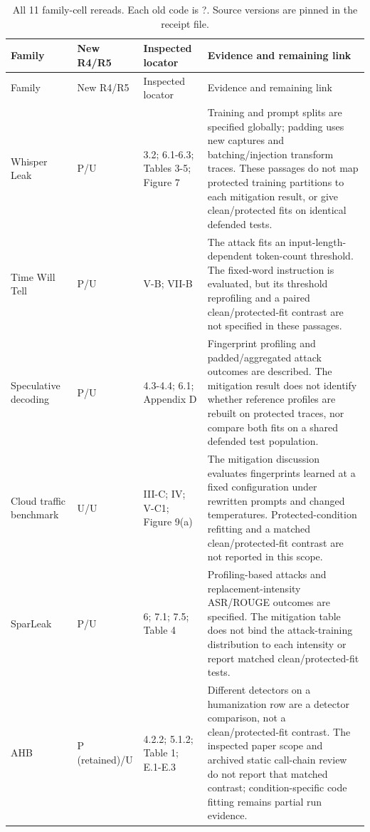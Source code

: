 \begin{longtable}{@{}p{}p{}p{}p{}@{}}
\caption{All 11 family-cell rereads. Each old code is ?. Source versions are pinned in the receipt file.}\label{tab:r26-source-review}\\
\toprule Family & New R4/R5 & Inspected locator & Evidence and remaining link\\\midrule\endfirsthead
\toprule Family & New R4/R5 & Inspected locator & Evidence and remaining link\\\midrule\endhead
\bottomrule\endfoot
Whisper Leak~\cite{whisperleak2025} & P/U & 3.2; 6.1-6.3; Tables 3-5; Figure 7 & Training and prompt splits are specified globally; padding uses new captures and batching/injection transform traces. These passages do not map protected training partitions to each mitigation result, or give clean/protected fits on identical defended tests.\\
Time Will Tell~\cite{timewilltell2024} & P/U & V-B; VII-B & The attack fits an input-length-dependent token-count threshold. The fixed-word instruction is evaluated, but its threshold reprofiling and a paired clean/protected-fit contrast are not specified in these passages.\\
Speculative decoding~\cite{wei2024speculation} & P/U & 4.3-4.4; 6.1; Appendix D & Fingerprint profiling and padded/aggregated attack outcomes are described. The mitigation result does not identify whether reference profiles are rebuilt on protected traces, nor compare both fits on a shared defended test population.\\
Cloud traffic benchmark~\cite{pouryousef2026traffic} & U/U & III-C; IV; V-C1; Figure 9(a) & The mitigation discussion evaluates fingerprints learned at a fixed configuration under rewritten prompts and changed temperatures. Protected-condition refitting and a matched clean/protected-fit contrast are not reported in this scope.\\
SparLeak~\cite{chen2026sparleak} & P/U & 6; 7.1; 7.5; Table 4 & Profiling-based attacks and replacement-intensity ASR/ROUGE outcomes are specified. The mitigation table does not bind the attack-training distribution to each intensity or report matched clean/protected-fit tests.\\
AHB~\cite{zhu2026turing} & P (retained)/U & 4.2.2; 5.1.2; Table 1; E.1-E.3 & Different detectors on a humanization row are a detector comparison, not a clean/protected-fit contrast. The inspected paper scope and archived static call-chain review do not report that matched contrast; condition-specific code fitting remains partial run evidence.\\
\end{longtable}
